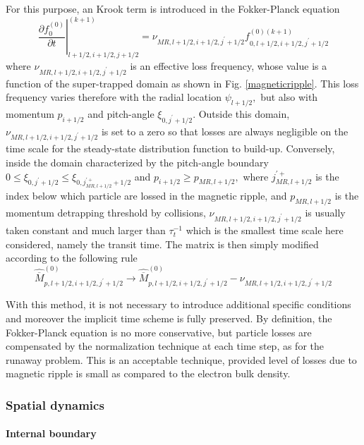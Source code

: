 For this purpose, an Krook term is introduced in the Fokker-Planck equation
\begin{equation}
\left. \frac{\partial f_{0}^{\left( 0\right) }}{\partial t}\right|
_{l+1/2,i+1/2,j+1/2}^{(k+1)}=\nu _{MR,l+1/2,i+1/2,j^{\prime
}+1/2}f_{0,l+1/2,i+1/2,j^{\prime }+1/2}^{\left( 0\right) (k+1)}
\end{equation}
where $\nu _{MR,l+1/2,i+1/2,j^{\prime }+1/2}$ is an effective loss
frequency, whose value is a function of the super-trapped domain as shown in
Fig. \ref{magneticripple}. This loss frequency varies therefore with the
radial location $\psi _{l+1/2},$ but also with momentum $p_{i+1/2}$ and
pitch-angle $\xi _{0,j^{\prime }+1/2}$. Outside this domain, $\nu
_{MR,l+1/2,i+1/2,j^{\prime }+1/2}$ is set to a zero so that losses are
always negligible on the time scale for the steady-state distribution
function to build-up. Conversely, inside the domain characterized by the
pitch-angle boundary $0\leq \xi _{0,j^{\prime }+1/2}\leq \xi
_{0,j_{MR,l+1/2}^{\prime +}+1/2}$ and $p_{i+1/2}\geq p_{MR,l+1/2},$ where $%
j_{MR,l+1/2}^{\prime +}$ is the index below which particle are lossed in the
magnetic ripple, and $p_{MR,l+1/2}$ is the momentum detrapping threshold by
collisions, $\nu _{MR,l+1/2,i+1/2,j^{\prime }+1/2}$ is usually taken
constant and much larger than $\tau _{t}^{-1}$ which is the smallest time
scale here considered, namely the transit time$.$ The matrix is then simply
modified according to the following rule
\begin{equation}
\widehat{\overline{M}}_{p,l+1/2,i+1/2,j^{\prime }+1/2}^{\left( 0\right)
}\rightarrow \widehat{\overline{M}}_{p,l+1/2,i+1/2,j^{\prime }+1/2}^{\left(
0\right) }-\nu _{MR,l+1/2,i+1/2,j^{\prime }+1/2}
\end{equation}

With this method, it is not necessary to introduce additional specific
conditions and moreover the implicit time scheme is fully preserved. By
definition, the Fokker-Planck equation is no more conservative, but particle
losses are compensated by the normalization technique at each time step, as
for the runaway problem. This is an acceptable technique, provided level of
losses due to magnetic ripple is small as compared to the electron bulk
density.

\subsubsection{Spatial dynamics}

\paragraph{Internal boundary}

